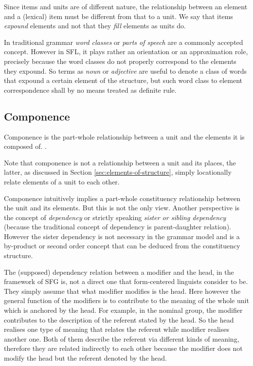 Since items and units are of different nature, the relationship between an element and a (lexical) item must be different from that to a unit. We say that items \textit{expound} elements and not that they \textit{fill} elements as units do.  

In traditional grammar \textit{word classes} or \textit{parts of speech} are a commonly accepted concept. However in SFL, it plays rather an orientation or an approximation role, precisely because the word classes do not properly correspond to the elements they expound. So terms as \textit{noun} or \textit{adjective} are useful to denote a class of words that expound a certain element of the structure, but such word class to element correspondence shall by no means treated as definite rule.

\subsection{Componence}
\label{sec:componence}
\begin{definition}[Componence]\label{def:componence}
    Componence is the part-whole relationship between a unit and the elements it is composed of. \citep[p.244]{Fawcett2000}. 
\end{definition}

Note that componence is not a relationship between a unit and its places, the latter, as discussed in Section \ref{sec:elements-of-structure}, simply locationally relate elements of a unit to each other. 

Componence intuitively implies a part-whole constituency relationship between the unit and its elements. But this is not the only view. Another perspective is the concept of \textit{dependency} or strictly speaking \textit{sister or sibling dependency} (because the traditional concept of dependency is parent-daughter relation). However the sister dependency is not necessary in the grammar model and is a by-product or second order concept that can be deduced from the constituency structure. 

The (supposed) dependency relation between a modifier and the head, in the framework of SFG is, not a direct one that form-centered linguists consider to be. They simply assume that what modifier modifies is the head. Here however the general function of the modifiers is to contribute to the meaning of the whole unit which is anchored by the head. For example, in the nominal group, the modifier contributes to the description of the referent stated by the head. So the head realises one type of meaning that relates the referent while modifier realises another one. Both of them describe the referent via different kinds of meaning, therefore they are related indirectly to each other because the modifier does not modify the head but the referent denoted by the head. \citep[p.216]{Fawcett2000}

